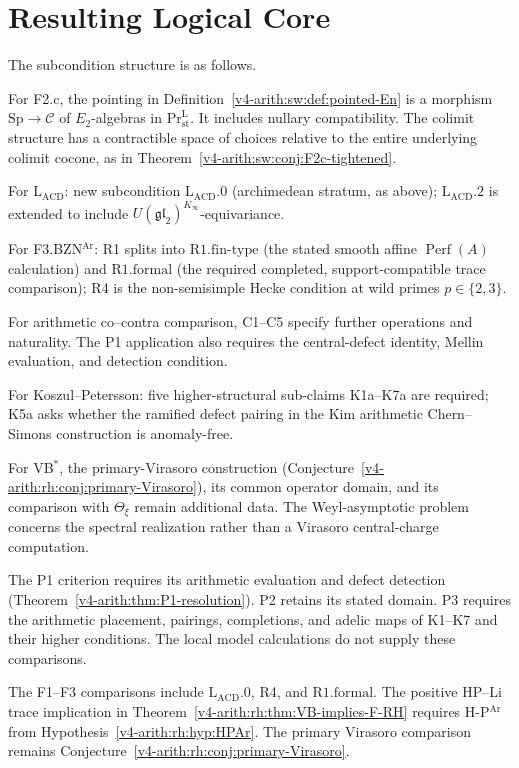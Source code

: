 \section{Resulting Logical Core}
\label{v4-arith:sw:wave2-corrections}

The subcondition structure is as follows.

For F2.c, the pointing in
Definition~\ref{v4-arith:sw:def:pointed-En} is a morphism
\(\mathrm{Sp}\to\mathcal C\) of \(E_2\)-algebras in
\(\mathrm{Pr}^{\mathrm L}_{\mathrm{st}}\). It includes nullary
compatibility. The colimit structure has a contractible space
of choices relative to the entire underlying colimit cocone,
as in Theorem~\ref{v4-arith:sw:conj:F2c-tightened}.

For \(\mathrm{L}_{\mathrm{ACD}}\): new subcondition
\(\mathrm{L}_{\mathrm{ACD}}.0\) (archimedean stratum, as above);
\(\mathrm{L}_{\mathrm{ACD}}.2\) is extended to include
\(U(\mathfrak{gl}_{2})^{K_{\infty}}\)-equivariance.

For F3.BZN\(^{\mathrm{Ar}}\): R1 splits into
\(\mathrm{R1.fin\text{-}type}\) (the stated smooth affine
\(\operatorname{Perf}(A)\) calculation) and \(\mathrm{R1.formal}\)
(the required completed, support-compatible trace comparison); R4 is the non-semisimple
Hecke condition at wild primes \(p\in\{2,3\}\).

For arithmetic co--contra comparison, C1--C5 specify further
operations and naturality. The P1 application also requires the
central-defect identity, Mellin evaluation, and detection condition.

For Koszul--Petersson: five higher-structural sub-claims K1a--K7a
are required; K5a asks whether the ramified defect pairing in the
Kim arithmetic Chern--Simons construction is anomaly-free.

For VB\(^{*}\), the primary-Virasoro construction
(Conjecture~\ref{v4-arith:rh:conj:primary-Virasoro}), its common operator domain,
and its comparison with \(\Theta_\xi\) remain additional data.
The Weyl-asymptotic problem concerns the spectral realization rather
than a Virasoro central-charge computation.

The P1 criterion requires its arithmetic evaluation and defect
detection (Theorem~\ref{v4-arith:thm:P1-resolution}). P2 retains its
stated domain. P3 requires the arithmetic placement, pairings, completions, and
adelic maps of K1--K7 and their higher conditions. The local model
calculations do not supply these comparisons.

The F1--F3 comparisons include
\(\mathrm{L}_{\mathrm{ACD}}.0\), R4, and
\(\mathrm{R1.formal}\). The positive HP--Li trace implication
in Theorem~\ref{v4-arith:rh:thm:VB-implies-F-RH} requires
H-P\(^{\mathrm{Ar}}\) from Hypothesis~\ref{v4-arith:rh:hyp:HPAr}.
The primary Virasoro comparison remains
Conjecture~\ref{v4-arith:rh:conj:primary-Virasoro}.

